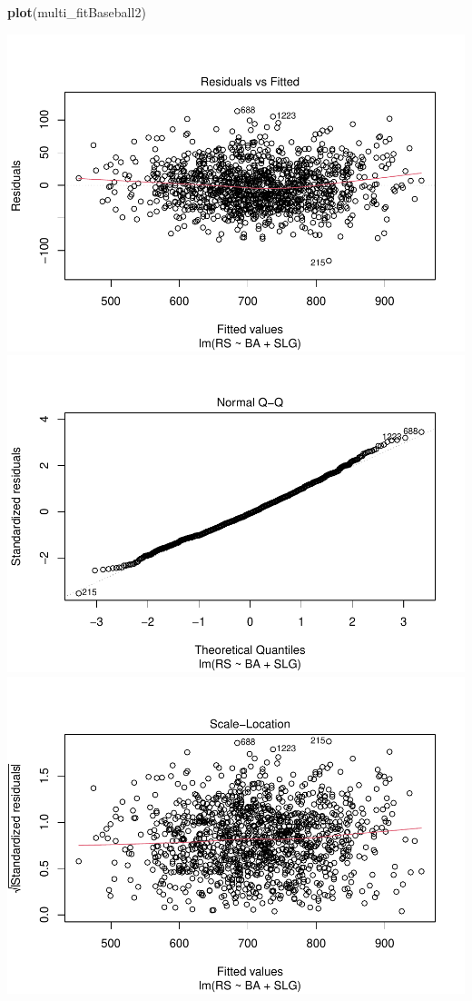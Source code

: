 \documentclass[
]{article}
\newenvironment{Shaded}{\begin{snugshade}}{\end{snugshade}}
\newcommand{\KeywordTok}[1]{\textcolor[rgb]{0.13,0.29,0.53}{\textbf{#1}}}
\newcommand{\NormalTok}[1]{#1}
\begin{document}
\begin{Shaded}
\begin{Highlighting}[]
\KeywordTok{plot}\NormalTok{(multi_fitBaseball2)}
\end{Highlighting}
\end{Shaded}

\includegraphics{HW2_Liu-Zi-Jian_files/figure-latex/unnamed-chunk-40-1.pdf}
\includegraphics{HW2_Liu-Zi-Jian_files/figure-latex/unnamed-chunk-40-2.pdf}
\includegraphics{HW2_Liu-Zi-Jian_files/figure-latex/unnamed-chunk-40-3.pdf}
\end{document}
